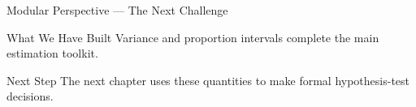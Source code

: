 \documentclass[aspectratio=169,xcolor={dvipsnames,table}]{beamer}
\begin{document}
\begin{frame}{Modular Perspective --- The Next Challenge}
  \small
  \begin{block}{What We Have Built}
    Variance and proportion intervals complete the main estimation toolkit.
  \end{block}
  \pause
  \begin{alertblock}{Next Step}
    The next chapter uses these quantities to make formal hypothesis-test decisions.
  \end{alertblock}
\end{frame}
\end{document}
